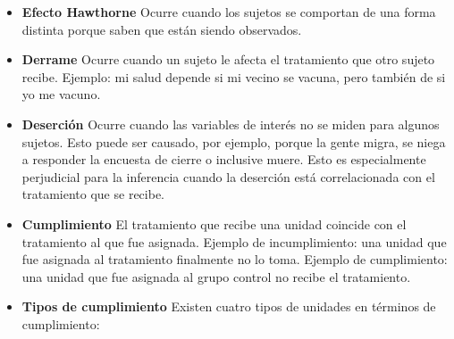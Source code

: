 \documentclass[12pt,spanish,]{book}
\providecommand{\tightlist}{%
  \setlength{\itemsep}{0pt}\setlength{\parskip}{0pt}}
\begin{document}
\begin{itemize}
\tightlist
\item
  \textbf{Efecto Hawthorne} Ocurre cuando los sujetos se comportan de una forma distinta porque saben que están siendo observados.
\item
  \textbf{Derrame} Ocurre cuando un sujeto le afecta el tratamiento que otro sujeto recibe.
  Ejemplo: mi salud depende si mi vecino se vacuna, pero también de si yo me vacuno.
\item
  \textbf{Deserción} Ocurre cuando las variables de interés no se miden para algunos sujetos. Esto puede ser causado, por ejemplo, porque la gente migra, se niega a responder la encuesta de cierre o inclusive muere. Esto es especialmente perjudicial para la inferencia cuando la deserción está correlacionada con el tratamiento que se recibe.
\item
  \textbf{Cumplimiento} El tratamiento que recibe una unidad coincide con el tratamiento al que fue asignada. Ejemplo de incumplimiento: una unidad que fue asignada al tratamiento finalmente no lo toma. Ejemplo de cumplimiento: una unidad que fue asignada al grupo control no recibe el tratamiento.
\item
  \textbf{Tipos de cumplimiento} Existen cuatro tipos de unidades en términos de cumplimiento:


\end{itemize}
\end{document}
